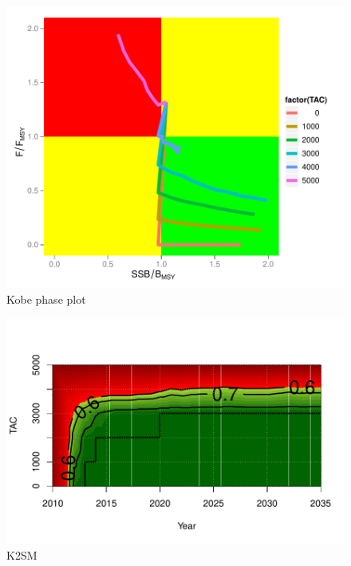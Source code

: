 \documentclass[a4paper, 11pt, oldtoc]{artikel1}
\begin{document}
\begin{figure}
\begin{center}
\includegraphics{kobe-006}
\caption{Kobe phase plot}
\end{center}
\end{figure}

\begin{figure}
\begin{center}
\includegraphics{kobe-007}
\caption{K2SM}
\end{center}
\end{figure}
\end{document}
